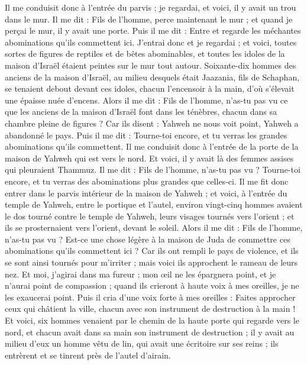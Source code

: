 \begin{multicols}{2}
Il me conduisit donc à l'entrée du parvis ; je regardai, et voici, il y avait un trou dans le mur.
Il me dit : Fils de l’homme, perce maintenant le mur ; et quand je perçai le mur, il y avait une porte.
Puis il me dit : Entre et regarde les méchantes abominations qu'ils commettent ici.
J'entrai donc et je regardai ; et voici, toutes sortes de figures de reptiles et de bêtes abominables, et toutes les idoles de la maison d'Israël étaient peintes sur le mur tout autour.
Soixante-dix hommes des anciens de la maison d'Israël, au milieu desquels était Jaazania, fils de Schaphan, se tenaient debout devant ces idoles, chacun l’encensoir à la main, d'où s’élevait une épaisse nuée d’encens.
Alors il me dit : Fils de l’homme, n'as-tu pas vu ce que les anciens de la maison d'Israël font dans les ténèbres, chacun dans sa chambre pleine de figures ? Car ils disent : Yahweh ne nous voit point, Yahweh a abandonné le pays.
Puis il me dit : Tourne-toi encore, et tu verras les grandes abominations qu’ils commettent.
Il me conduisit donc à l'entrée de la porte de la maison de Yahweh qui est vers le nord. Et voici, il y avait là des femmes assises qui pleuraient Thammuz.
Il me dit : Fils de l’homme, n'as-tu pas vu ? Tourne-toi encore, et tu verras des abominations plus grandes que celles-ci.
Il me fit donc entrer dans le parvis intérieur de la maison de Yahweh ; et voici, à l'entrée du temple de Yahweh, entre le portique et l'autel, environ vingt-cinq hommes avaient le dos tourné contre le temple de Yahweh, leurs visages tournés vers l'orient ; et ils se prosternaient vers l'orient, devant le soleil.
Alors il me dit : Fils de l’homme, n'as-tu pas vu ? Est-ce une chose légère à la maison de Juda de commettre ces abominations qu'ils commettent ici ? Car ils ont rempli le pays de violence, et ils se sont ainsi tournés pour m'irriter ; mais voici ils approchent le rameau de leurs nez.
Et moi, j'agirai dans ma fureur ; mon œil ne les épargnera point, et je n'aurai point de compassion ; quand ils crieront à haute voix à mes oreilles, je ne les exaucerai point.
\VerseOne{}Puis il cria d'une voix forte à mes oreilles : Faites approcher ceux qui châtient la ville, chacun avec son instrument de destruction à la main !
Et voici, six hommes venaient par le chemin de la haute porte qui regarde vers le nord, et chacun avait dans sa main son instrument de destruction ; il y avait au milieu d'eux un homme vêtu de lin, qui avait une écritoire sur ses reins ; ils entrèrent et se tinrent près de l'autel d'airain.

\end{multicols}
